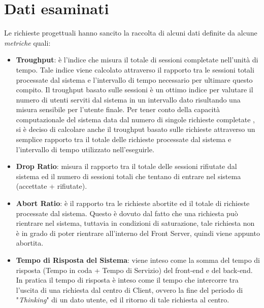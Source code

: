 \section{Dati esaminati}
Le richieste progettuali hanno sancito la raccolta di alcuni dati definite da alcune \textit{metriche} quali:
\begin{itemize}
\item \textbf{Troughput}:
è l'indice  che misura il totale di sessioni completate nell'unità di tempo. Tale indice viene calcolato attraverso il rapporto tra le sessioni totali processate dal sistema e l'intervallo di tempo necessario per ultimare questo compito.  Il troughput basato sulle sessioni è un ottimo indice per valutare il numero di utenti serviti dal sistema in un intervallo dato risultando una misura sensibile per l'utente finale. Per tener conto della capacità computazionale del sistema data dal numero di singole richieste completate , si è deciso di calcolare anche il troughput basato sulle richieste  attraverso un semplice rapporto tra il totale delle richieste processate dal sistema e l'intervallo di tempo utilizzato nell'eseguirle.

\item \textbf{Drop Ratio}:
misura il rapporto tra il totale delle sessioni rifiutate dal sistema ed il numero di sessioni totali che tentano di entrare nel sistema (accettate + rifiutate).

\item \textbf{Abort Ratio}:
è il rapporto tra le richieste abortite ed il totale di richieste processate dal sistema.
Questo è dovuto dal fatto che una richiesta può rientrare nel sistema, tuttavia in condizioni di saturazione, tale richiesta non è in grado di poter rientrare all'interno del Front Server, quindi viene appunto abortita.

\item \textbf{Tempo di Risposta del Sistema}:
viene inteso come la somma del tempo di risposta (Tempo in coda + Tempo di Servizio) del front-end e del back-end.
In pratica il tempo di risposta è inteso come il tempo che intercorre tra l'uscita di una richiesta dal centro di Client, ovvero la fine del periodo di "\textit{Thinking}" di un dato utente, ed il ritorno di tale richiesta al centro.



\end{itemize}
